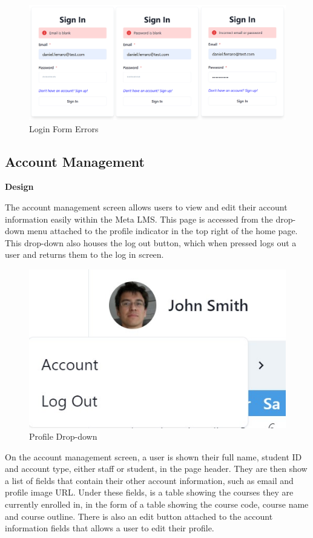 \begin{figure}[h!]
    \centering
    \includegraphics[scale=0.15]{images/accounts-login-errors.png}
    \caption{Login Form Errors}
\end{figure}

\subsection{Account Management}
\textbf{Design}

The account management screen allows users to view and edit their account information easily within the Meta LMS. This page is accessed from the drop-down menu attached to the profile indicator in the top right of the home page. This drop-down also houses the log out button, which when pressed logs out a user and returns them to the log in screen.

\begin{figure}[h!]
    \centering
    \includegraphics[scale=0.4]{images/accounts-account-dropdown.jpg}
    \caption{Profile Drop-down}
\end{figure}

On the account management screen, a user is shown their full name, student ID and account type, either staff or student, in the page header. They are then show a list of fields that contain their other account information, such as email and profile image URL. Under these fields, is a table showing the courses they are currently enrolled in, in the form of a table showing the course code, course name and course outline. There is also an edit button attached to the account information fields that allows a user to edit their profile.

